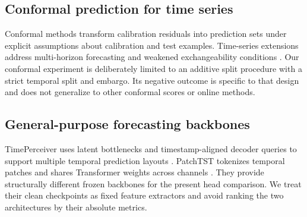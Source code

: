 \subsection{Conformal prediction for time series}

Conformal methods transform calibration residuals into prediction sets under explicit assumptions about calibration and test examples. Time-series extensions address multi-horizon forecasting and weakened exchangeability conditions \cite{stankeviciute2021conformal}. Our conformal experiment is deliberately limited to an additive split procedure with a strict temporal split and embargo. Its negative outcome is specific to that design and does not generalize to other conformal scores or online methods.

\subsection{General-purpose forecasting backbones}

TimePerceiver uses latent bottlenecks and timestamp-aligned decoder queries to support multiple temporal prediction layouts \cite{lee2025timeperceiver}. PatchTST tokenizes temporal patches and shares Transformer weights across channels \cite{nie2023patchtst}. They provide structurally different frozen backbones for the present head comparison. We treat their clean checkpoints as fixed feature extractors and avoid ranking the two architectures by their absolute metrics.
